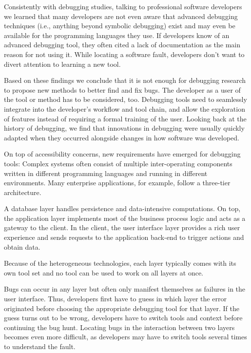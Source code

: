 Consistently with debugging studies, talking to professional software developers we learned that many developers are not even aware that advanced debugging techniques (i.e., anything beyond symbolic debugging) exist and may even be available for the programming languages they use.
If developers know of an advanced debugging tool, they often cited a lack of documentation as the main reason for not using it.
While locating a software fault, developers don't want to divert attention to learning a new tool.

Based on these findings we conclude that it is not enough for debugging research to propose new methods to better find and fix bugs.
The developer as a user of the tool or method has to be considered, too.
Debugging tools need to seamlessly integrate into the developer's workflow and tool chain, and allow the exploration of features instead of requiring a formal training of the user.
Looking back at the history of debugging, we find that innovations in debugging were usually quickly adapted when they occurred alongside changes in how software was developed.

On top of accessibility concerns, new requirements have emerged for debugging tools:
Complex systems often consist of multiple inter-operating components written in different programming languages and running in different environments.
Many enterprise applications, for example, follow a three-tier architecture.

A database layer handles persistence and data-intensive computations.
On top, the application layer implements most of the business process logic and acts as a gateway to the client.
In the client, the user interface layer provides a rich user experience and sends requests to the application back-end to trigger actions and obtain data.

Because of the heterogeneous technologies, each layer typically comes with its own tool set and no tool can be used to work on all layers at once.

Bugs can occur in any layer but often only manifest themselves as failures in the user interface.
Thus, developers first have to guess in which layer the error originated before choosing the appropriate debugging tool for that layer.
If the guess turns out to be wrong, developers have to switch tools and context before continuing the bug hunt.
Locating bugs in the interaction between two layers becomes even more difficult, as developers may have to switch tools several times to understand the fault.

